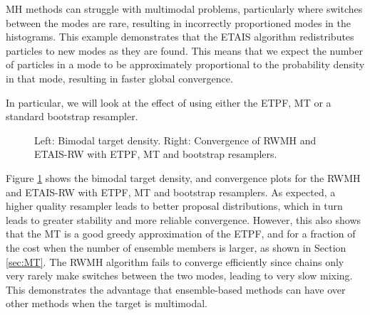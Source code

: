 \documentclass[final]{siamltex}
\begin{document}
MH methods can struggle
with multimodal problems, particularly where switches between the
modes are rare, resulting in incorrectly proportioned modes in the
histograms. This example demonstrates that the ETAIS algorithm
redistributes particles to new modes as they are found. This means
that we expect the number of particles in a mode to be approximately
proportional to the probability density in that mode, resulting in
faster global convergence. {\red In particular, we will look at the effect
of using either the ETPF, MT or a standard bootstrap resampler.

\begin{figure}[htb]
\centering 
{}

\caption{Left: Bimodal target density. Right: Convergence of RWMH and
  ETAIS-RW with ETPF, MT and bootstrap resamplers. }
\label{kshdbf}
\end{figure}

Figure \ref{kshdbf} shows the bimodal target density, and convergence
plots for the RWMH and ETAIS-RW with ETPF, MT and bootstrap
resamplers. As expected, a higher quality resampler leads to better
proposal distributions, which in turn leads to greater stability and
more reliable convergence. However, this also shows that the MT is a
good greedy approximation of the ETPF, and for a fraction of the cost
when the number of ensemble members is larger, as shown in Section
\ref{sec:MT}. The RWMH algorithm fails to converge efficiently since chains only very rarely
make switches between the two modes, leading to very slow mixing. This
demonstrates the advantage that ensemble-based methods can have over
other methods when the target
is multimodal.

}
\end{document}
